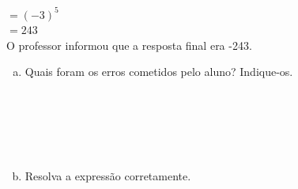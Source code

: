 \documentclass[a4paper,14pt]{article}
\begin{document}
\begin{multicols}{2}
\begin{enumerate}
			$=(-3)^5$ \\
			$= 243$ \\
			O professor informou que a resposta final era -243.
			\begin{enumerate}[a)]
				\item Quais foram os erros cometidos pelo aluno? Indique-os. \\\\\\\\\\\\
				\item Resolva a expressão corretamente. \\\\\\\\\\\\
			\end{enumerate}
		\end{enumerate}
	\end{multicols}
\end{document}

